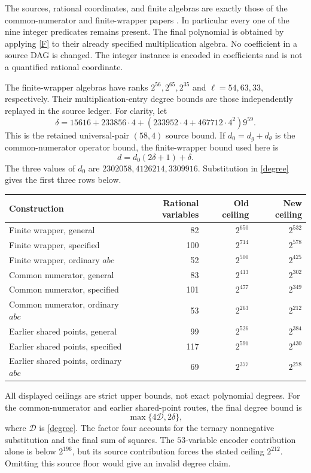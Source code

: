 \documentclass[11pt]{article}
\begin{document}
The sources, rational coordinates, and finite algebras are exactly
those of the common-numerator and finite-wrapper papers
\cite{common,wrapper}. In particular every one of the nine integer
predicates remains present. The final polynomial is obtained by
applying \eqref{F} to their already specified multiplication algebra.
No coefficient in a source DAG is changed. The integer instance is
encoded in coefficients and is not a quantified rational coordinate.

The finite-wrapper algebras have ranks \(2^{56},2^{65},2^{35}\)
and \(\ell=54,63,33\), respectively. Their multiplication-entry
degree bounds are those independently replayed in the source ledger.
For clarity, let
\[
 \delta=15616+233856\cdot4+
           (233952\cdot4+467712\cdot4^2)9^{59}.
\]
This is the retained universal-pair \((58,4)\) source bound. If
\(d_0=d_g+d_\theta\) is the common-numerator operator bound, the
finite-wrapper bound used here is
\[
                         d=d_0(2\delta+1)+\delta.
\]
The three values of \(d_0\) are
\(2302058,4126214,3309916\). Substitution in \eqref{degree}
gives the first three rows below.

\begin{center}\small
\begin{tabular}{lrrr}
\toprule
Construction & Rational variables & Old ceiling & New ceiling\\
\midrule
Finite wrapper, general &82&\(2^{650}\)&\(2^{532}\)\\
Finite wrapper, specified &100&\(2^{714}\)&\(2^{578}\)\\
Finite wrapper, ordinary \(abc\)&52&\(2^{500}\)&\(2^{425}\)\\
Common numerator, general &83&\(2^{413}\)&\(2^{302}\)\\
Common numerator, specified &101&\(2^{477}\)&\(2^{349}\)\\
Common numerator, ordinary \(abc\)&53&\(2^{263}\)&\(2^{212}\)\\
Earlier shared points, general &99&\(2^{526}\)&\(2^{384}\)\\
Earlier shared points, specified &117&\(2^{591}\)&\(2^{430}\)\\
Earlier shared points, ordinary \(abc\)&69&\(2^{377}\)&\(2^{278}\)\\
\bottomrule
\end{tabular}
\end{center}
All displayed ceilings are strict upper bounds, not exact polynomial
degrees. For the common-numerator and earlier shared-point routes,
the final degree bound is
\[
                     \max\{4\mathcal D,2\delta\},
\]
where \(\mathcal D\) is \eqref{degree}. The factor four accounts
for the ternary nonnegative substitution and the final sum of squares.
The \(53\)-variable encoder contribution alone is below \(2^{196}\),
but its source contribution forces the stated ceiling \(2^{212}\).
Omitting this source floor would give an invalid degree claim.
\end{document}
